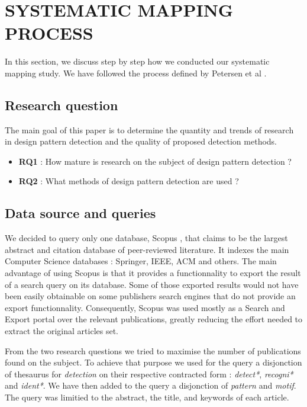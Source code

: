 \documentclass[letterpaper, 10 pt, conference]{ieeeconf}  %
\begin{document}

\section{SYSTEMATIC MAPPING PROCESS}

In this section, we discuss step by step how we conducted our systematic
mapping study.
We have followed the process defined by Petersen et al \cite{c1}. 

\subsection{Research question}

The main goal of this paper is to determine the quantity and trends of research
in design pattern detection and the quality of proposed detection methods.

\begin{itemize}
	\item \textbf{RQ1} : How mature is research on the subject of design pattern detection ?
	\item \textbf{RQ2} : What methods of design pattern detection are used ?
\end{itemize}


\subsection{Data source and queries}

We decided to query only one database, Scopus \cite{c2}, that claims to be the
largest abstract and citation database of peer-reviewed literature.
It indexes the main Computer Science databases : Springer, IEEE, ACM and
others.
The main advantage of using Scopus is that it provides a functionnality to
export the result of a search query on its database.
Some of those exported results would not have been easily obtainable on some
publishers search engines that do not provide an export functionnality.
Consequently, Scopus was used mostly as a Search and Export portal over the
relevant publications, greatly reducing the effort needed to extract the
original articles set. 

From the two research questions we tried to maximise the number of publications
found on the subject.
To achieve that purpose we used for the query a disjonction of thesaurus for
\textit{detection} on their respective contracted form : \textit{detect*},
\textit{recogni*} and \textit{ident*}.
We have then added to the query a disjonction of \textit{pattern} and \textit{motif}.
The query was limitied to the abstract, the title, and keywords of each article.
\end{document}
